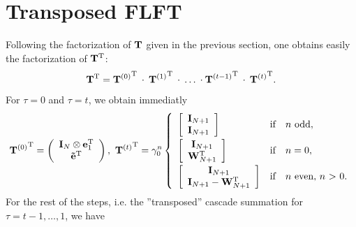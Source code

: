 \section{Transposed FLFT}
\label{NFSFT:transposedFLFT}
Following the factorization of $\mathbf{T}$ given in the previous section, one obtains easily the factorization of $\mathbf{T^{\text{\rm{T}}}}$:
\begin{equation}
  \label{NFSFT:transposedFactorization}
  \mathbf{T}^{\text{\rm{T}}} = {\mathbf{T}^{(0)}}^{\text{\rm{T}}} \: \cdot \: {\mathbf{T}^{(1)}}^{\text{\rm{T}}} \: \cdot \: \ldots \: \cdot {\mathbf{T}^{(t-1)}}^{\text{\rm{T}}} \: \cdot \: {\mathbf{T}^{(t)}}^{\text{\rm{T}}}.
\end{equation}
For $\tau = 0$ and $\tau = t$, we obtain immediatly
\[
  {\V{T}^{(0)}}^{\transp} = 
     \left(\begin{array}{c} 
       \V{I}_{N} \otimes \V{e}_{1}^{\transp}\\ 
       \V{\tilde{e}}^{\transp} 
     \end{array}\right),\  
   {\V{T}^{(t)}}^{\transp} = \gamma_{0}^n 
     \left\{\begin{array}{l@{\quad \text{if} \quad}l} 
       \left[ \begin{array}{c} \V{I}_{N+1} \\ \V{I}_{N+1}                         \end{array} \right] & \text{$n$ odd},          \\[2ex]
       \left[ \begin{array}{c} \V{I}_{N+1} \\               \V{W}_{N+1}^{\transp} \end{array} \right] & \text{$n = 0$},          \\[2ex]
       \left[ \begin{array}{c} \V{I}_{N+1} \\ \V{I}_{N+1} - \V{W}_{N+1}^{\transp} \end{array} \right] & \text{$n$ even, $n$ > 0}.
     \end{array}\right.
\]
For the rest of the steps, i.e. the ''transposed'' cascade summation for $\tau = t-1,\ldots,1$, we have
